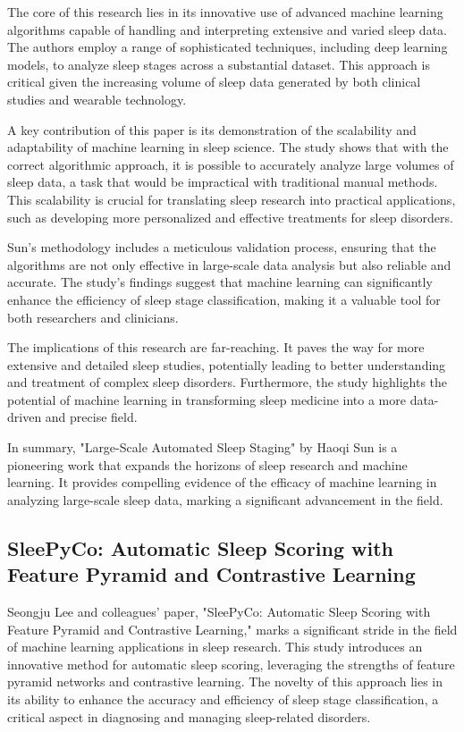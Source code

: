 \documentclass[12pt, a4paper,oneside]{book}
\numberwithin{equation}{section}
\begin{document}
The core of this research lies in its innovative use of advanced machine learning algorithms capable of handling and interpreting extensive and varied sleep data. The authors employ a range of sophisticated techniques, including deep learning models, to analyze sleep stages across a substantial dataset. This approach is critical given the increasing volume of sleep data generated by both clinical studies and wearable technology.\cite{Sun2017}

A key contribution of this paper is its demonstration of the scalability and adaptability of machine learning in sleep science. The study shows that with the correct algorithmic approach, it is possible to accurately analyze large volumes of sleep data, a task that would be impractical with traditional manual methods. This scalability is crucial for translating sleep research into practical applications, such as developing more personalized and effective treatments for sleep disorders.\cite{Sun2017}

Sun's methodology includes a meticulous validation process, ensuring that the algorithms are not only effective in large-scale data analysis but also reliable and accurate. The study's findings suggest that machine learning can significantly enhance the efficiency of sleep stage classification, making it a valuable tool for both researchers and clinicians.\cite{Sun2017}

The implications of this research are far-reaching. It paves the way for more extensive and detailed sleep studies, potentially leading to better understanding and treatment of complex sleep disorders. Furthermore, the study highlights the potential of machine learning in transforming sleep medicine into a more data-driven and precise field.\cite{Sun2017}

In summary, "Large-Scale Automated Sleep Staging" by Haoqi Sun is a pioneering work that expands the horizons of sleep research and machine learning. It provides compelling evidence of the efficacy of machine learning in analyzing large-scale sleep data, marking a significant advancement in the field.\cite{Sun2017}

\subsection{SleePyCo: Automatic Sleep Scoring with Feature Pyramid and Contrastive Learning}
Seongju Lee and colleagues' paper, "SleePyCo: Automatic Sleep Scoring with Feature Pyramid and Contrastive Learning," marks a significant stride in the field of machine learning applications in sleep research. This study introduces an innovative method for automatic sleep scoring, leveraging the strengths of feature pyramid networks and contrastive learning. The novelty of this approach lies in its ability to enhance the accuracy and efficiency of sleep stage classification, a critical aspect in diagnosing and managing sleep-related disorders.\cite{SleePyCo2021}
\end{document}
